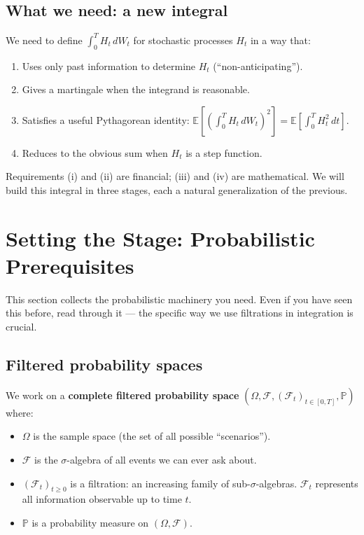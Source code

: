 \documentclass[11pt,a4paper]{article}
\theoremstyle{definition}
\theoremstyle{plain}
\theoremstyle{remark}
\newcommand{\E}{\mathbb{E}}
\newcommand{\Prob}{\mathbb{P}}
\newcommand{\F}{\mathcal{F}}
\begin{document}
\subsection{What we need: a new integral}

We need to define $\int_0^T H_t\,dW_t$ for stochastic processes $H_t$ in a way that:
\begin{enumerate}[label=(\roman*)]
  \item Uses only past information to determine $H_t$ (``non-anticipating'').
  \item Gives a martingale when the integrand is reasonable.
  \item Satisfies a useful Pythagorean identity: $\E\left[\left(\int_0^T H_t\,dW_t\right)^2\right] = \E\left[\int_0^T H_t^2\,dt\right]$.
  \item Reduces to the obvious sum when $H_t$ is a step function.
\end{enumerate}

Requirements (i) and (ii) are financial; (iii) and (iv) are mathematical. We will build this integral in three stages, each a natural generalization of the previous.

\section{Setting the Stage: Probabilistic Prerequisites}
\label{sec:prereqs}

This section collects the probabilistic machinery you need. Even if you have seen this before, read through it — the specific way we use filtrations in integration is crucial.

\subsection{Filtered probability spaces}

We work on a \textbf{complete filtered probability space} $(\Omega, \F, (\F_t)_{t \in [0,T]}, \Prob)$ where:
\begin{itemize}
  \item $\Omega$ is the sample space (the set of all possible ``scenarios'').
  \item $\F$ is the $\sigma$-algebra of all events we can ever ask about.
  \item $(\F_t)_{t \geq 0}$ is a filtration: an increasing family of sub-$\sigma$-algebras. $\F_t$ represents all information observable up to time $t$.
  \item $\Prob$ is a probability measure on $(\Omega, \F)$.
\end{itemize}
\end{document}
